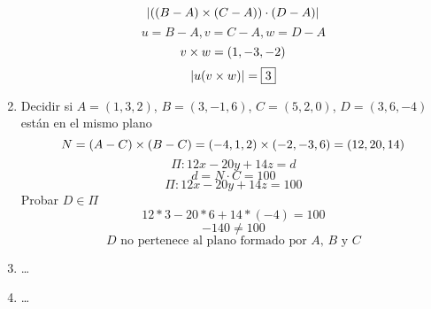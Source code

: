 \documentclass[../practica.root.tex]{subfiles}
\begin{document}
\begin{enumerate}
          \[ | ((B-A)\times(C-A))\cdot(D-A) | \]
          \[ u = B - A, v = C - A, w = D - A \]
          \[ v\times w = (1, -3, -2) \]
          \[ | u(v \times w) | = \boxed{3} \]

    \item Decidir si $A = (1,3,2)$, $B = (3,-1,6)$, $C = (5,2,0)$, $D = (3,6,-4)$ están en el mismo plano
          \[ N = (A-C) \times (B-C) = (-4,1,2) \times (-2,-3,6) = (12,20,14) \]
          \[ \Pi: 12x - 20y + 14z = d \]
          \[ d = N \cdot C = 100 \]
          \[ \Pi: 12x - 20y + 14z = 100 \]
          Probar $D \in \Pi$
          \[ 12*3 - 20*6 + 14*(-4) = 100 \]
          \[ -140 \neq 100 \]
          \[ \boxed{\text{$D$ no pertenece al plano formado por $A$, $B$ y $C$}} \]


    \item \dots
    \item \dots


\end{enumerate}
\end{document}
